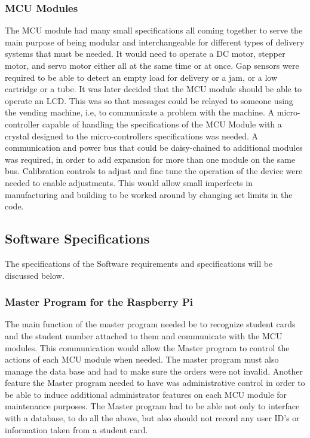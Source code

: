 \documentclass[a4paper,11pt]{article}
\numberwithin{figure}{section}
\numberwithin{table}{section}
\begin{document}
\subsubsection{MCU Modules}
The MCU module had many small specifications all coming together to serve the main purpose of being modular and interchangeable for different types of delivery systems that must be needed. It would need to operate a DC motor, stepper motor, and servo motor either all at the same time or at once. Gap sensors were required to be able to detect an empty load for delivery or a jam, or a low cartridge or a tube. It was later decided that the MCU module should be able to operate an LCD. This was so that messages could be relayed to someone using the vending machine, i.e, to communicate a problem with the machine. A micro-controller capable of handling the specifications of the MCU Module with a crystal designed to the micro-controllers specifications was needed. A communication and power bus that could be daisy-chained to additional modules was required, in order to add expansion for more than one module on the same bus. Calibration controls to adjust and fine tune the operation of the device were needed to enable adjustments. This would allow small imperfects in manufacturing and building to be worked around by changing set limits in the code.
\subsection{Software Specifications}
The specifications of the Software requirements and specifications will be discussed below.
\subsubsection{Master Program for the Raspberry Pi}
The main function of the master program needed be to recognize student cards and the student number attached to them and communicate with the MCU modules. This communication would allow the Master program to control the actions of each MCU module when needed. The master program must also manage the data base and had to make sure the orders were not invalid. Another feature the Master program needed to have was administrative control in order to be able to induce additional administrator features on each MCU module for maintenance purposes. The Master program had to be able not only to interface with a database, to do all the above, but also should not record any user ID's or information taken from a student card.
\end{document}
